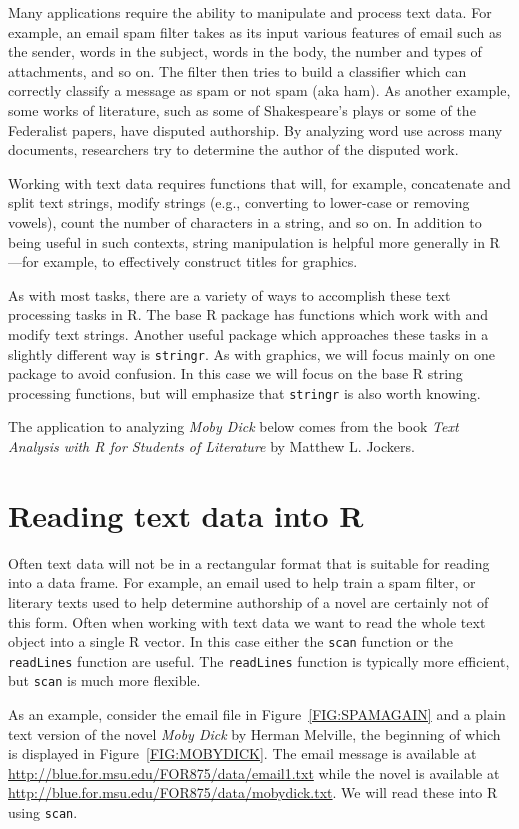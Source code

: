 \documentclass[12pt,oneside]{book}\usepackage[]{graphicx}\usepackage[]{color}
\begin{document}
{Many applications require the ability to manipulate and process text data. For example, an email spam filter takes as its input various features of email such as the sender, words in the subject, words in the body, the number and types of attachments, and so on. The filter then tries to build a classifier which can correctly classify a message as spam or not spam (aka ham). As another example, some works of literature, such as some of Shakespeare's plays or some of the Federalist papers, have disputed authorship. By analyzing word use across many documents, researchers try to determine the author of the disputed work.

Working with text data requires functions that will, for example, concatenate and split text strings, modify strings (e.g., converting to lower-case or removing vowels), count the number of characters in a string, and so on. In addition to being useful in such contexts, string manipulation is helpful more generally in R---for example, to effectively construct titles for graphics.

As with most tasks, there are a variety of ways to accomplish these text processing tasks in R. The base R package has functions which work with and modify text strings. Another useful package which approaches these tasks in a slightly different way is \verb+stringr+. As with graphics, we will focus mainly on one package to avoid confusion. In this case we will focus on the base R string processing functions, but will emphasize that \verb+stringr+ is also worth knowing.

The application to analyzing \emph{Moby Dick} below comes from the book \emph{Text Analysis with R for Students of Literature} by Matthew L. Jockers.

\section{Reading text data into R}
Often text data will not be in a rectangular format that is suitable for reading into a data frame. For example, an email used to help train a spam filter, or literary texts used to help determine authorship of a novel are certainly not of this form. Often when working with text data we want to read the whole text object into a single R vector. In this case either the \verb+scan+ function or the \verb+readLines+ function are useful. The \verb+readLines+ function is typically more efficient, but \verb+scan+ is much more flexible. 

As an example, consider the email file in Figure~\ref{FIG:SPAMAGAIN} and a plain text version of the novel \emph{Moby Dick} by Herman Melville, the beginning of which is displayed in Figure~\ref{FIG:MOBYDICK}. The email message is available at \url{http://blue.for.msu.edu/FOR875/data/email1.txt} while the novel is available at \url{http://blue.for.msu.edu/FOR875/data/mobydick.txt}. We will read these into R using \verb+scan+. 

}
\end{document}
